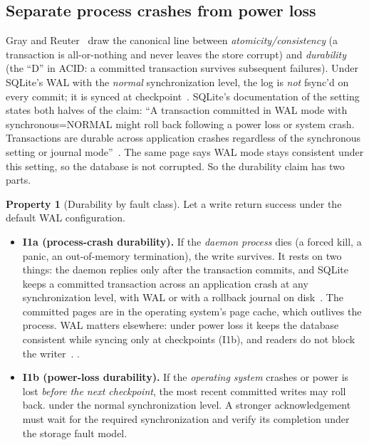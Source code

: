\documentclass[11pt,a4paper]{article}
\theoremstyle{definition}
\newtheorem{property}{Property}[section]
\theoremstyle{remark}
\begin{document}
\subsection{Separate process crashes from power loss}
Gray and Reuter~ draw the canonical line between
\emph{atomicity/consistency} (a transaction is all-or-nothing and never leaves the
store corrupt) and \emph{durability} (the ``D'' in ACID: a committed transaction
survives subsequent failures). Under SQLite's WAL with the \emph{normal}
synchronization level, the log is \emph{not} fsync'd on every commit; it is
synced at checkpoint~. SQLite's documentation of the setting
states both halves of the claim: ``A transaction committed in WAL mode with
synchronous=NORMAL might roll back following a power loss or system crash.
Transactions are durable across application crashes regardless of the synchronous
setting or journal mode''~. The same page says WAL mode stays
consistent under this setting, so the database is not corrupted. So the durability
claim has two parts.
\begin{property}[Durability by fault class]\label{prop:durability}
\setlength{\parskip}{4pt plus 1pt}
Let a write return success under the default WAL configuration.
\begin{itemize}[leftmargin=1.4em]
  \item \textbf{I1a (process-crash durability).} If the \emph{daemon process}
  dies (a forced kill, a panic, an out-of-memory termination), the write survives.
  It rests on two things: the daemon replies only after the transaction commits,
  and SQLite keeps a committed transaction across an application crash at any
  synchronization level, with WAL or with a rollback journal on
  disk~. The committed pages are in the operating system's
  page cache, which outlives the process. WAL matters elsewhere: under power
  loss it keeps the database consistent while syncing only at checkpoints (I1b),
  and readers do not block the writer~. \Built.
  \item \textbf{I1b (power-loss durability).} If the \emph{operating system}
  crashes or power is lost \emph{before the next checkpoint}, the most recent
  committed writes may roll back. \NotGuar{} under the normal synchronization
  level. A stronger acknowledgement must wait for the required synchronization
  and verify its completion under the storage fault model.
\end{itemize}
\end{property}
\end{document}
